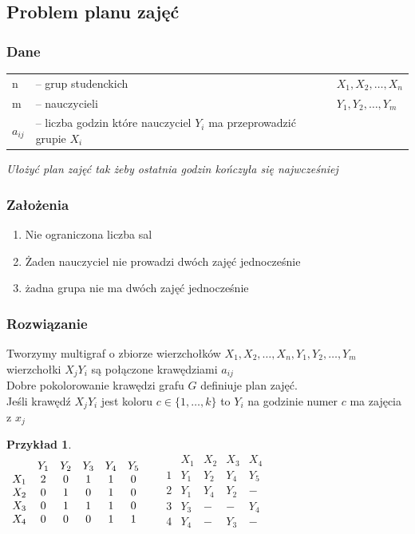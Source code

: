 \documentclass[12pt,a4paper]{article}
\newtheorem{przyklad}{Przykład}
\theoremstyle{definition}
\begin{document}
\subsection{Problem planu zajęć}
\subsubsection{Dane}
\begin{tabular}{l l l}
	n & -- grup studenckich & $X_1,X_2,\dots,X_n$\\
	m & -- nauczycieli & $Y_1,Y_2,\dots,Y_m$\\
	$a_{ij}$ & -- liczba godzin które nauczyciel $Y_i$ ma przeprowadzić grupie $X_i$ & \\
\end{tabular}

\emph{Ułożyć plan zajęć tak żeby ostatnia godzin kończyła się najwcześniej}
\subsubsection{Założenia}
\begin{enumerate}
	\item Nie ograniczona liczba sal
	\item Żaden nauczyciel nie prowadzi dwóch zajęć jednocześnie
	\item żadna grupa nie ma dwóch zajęć jednocześnie
\end{enumerate}
\subsubsection{Rozwiązanie}
Tworzymy multigraf o zbiorze wierzchołków $X_1,X_2,\dots,X_n, Y_1,Y_2,\dots,Y_m$ wierzchołki $X_jY_i$ są połączone krawędziami $a_{ij}$\\
Dobre pokolorowanie krawędzi grafu $G$ definiuje plan zajęć.\\
Jeśli krawędź $X_jY_i$ jest koloru $c\in \{1,\dots ,k\}$ to $Y_i$ na godzinie numer $c$ ma zajęcia z $x_j$\\
\begin{przyklad}~\\
$
\begin{array}{c c c c c c}
		& Y_1 & Y_2 & Y_3 & Y_4 & Y_5 \\
	X_1 & 2 & 0 & 1 & 1 & 0\\ 
	X_2 & 0 & 1 & 0 & 1 & 0\\
	X_3 & 0 & 1 & 1 & 1 & 0\\
	X_4 & 0 & 0 & 0 & 1 & 1\\
\end{array}
$%
~~$
\begin{array}{ccccc}
	  & X_1 & X_2 & X_3 & X_4\\
	1 & Y_1 & Y_2 & Y_4 & Y_5\\ 
	2 & Y_1 & Y_4 & Y_2 &  - \\
	3 & Y_3 &  -  &  -  & Y_4\\
	4 & Y_4 &  -  & Y_3 &  - \\
\end{array}
$
\end{przyklad}
\end{document}
